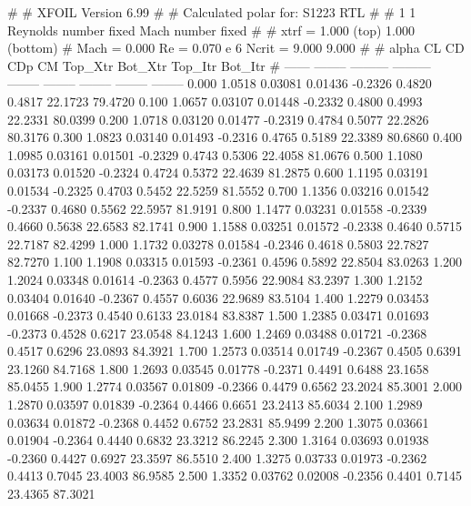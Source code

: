 #  
#       XFOIL         Version 6.99
#  
# Calculated polar for: S1223 RTL                                       
#  
# 1 1 Reynolds number fixed          Mach number fixed         
#  
# xtrf =   1.000 (top)        1.000 (bottom)  
# Mach =   0.000     Re =     0.070 e 6     Ncrit =   9.000  9.000
#  
#   alpha    CL        CD       CDp       CM     Top_Xtr  Bot_Xtr  Top_Itr  Bot_Itr
#  ------ -------- --------- --------- -------- -------- -------- -------- --------
   0.000   1.0518   0.03081   0.01436  -0.2326   0.4820   0.4817  22.1723  79.4720
   0.100   1.0657   0.03107   0.01448  -0.2332   0.4800   0.4993  22.2331  80.0399
   0.200   1.0718   0.03120   0.01477  -0.2319   0.4784   0.5077  22.2826  80.3176
   0.300   1.0823   0.03140   0.01493  -0.2316   0.4765   0.5189  22.3389  80.6860
   0.400   1.0985   0.03161   0.01501  -0.2329   0.4743   0.5306  22.4058  81.0676
   0.500   1.1080   0.03173   0.01520  -0.2324   0.4724   0.5372  22.4639  81.2875
   0.600   1.1195   0.03191   0.01534  -0.2325   0.4703   0.5452  22.5259  81.5552
   0.700   1.1356   0.03216   0.01542  -0.2337   0.4680   0.5562  22.5957  81.9191
   0.800   1.1477   0.03231   0.01558  -0.2339   0.4660   0.5638  22.6583  82.1741
   0.900   1.1588   0.03251   0.01572  -0.2338   0.4640   0.5715  22.7187  82.4299
   1.000   1.1732   0.03278   0.01584  -0.2346   0.4618   0.5803  22.7827  82.7270
   1.100   1.1908   0.03315   0.01593  -0.2361   0.4596   0.5892  22.8504  83.0263
   1.200   1.2024   0.03348   0.01614  -0.2363   0.4577   0.5956  22.9084  83.2397
   1.300   1.2152   0.03404   0.01640  -0.2367   0.4557   0.6036  22.9689  83.5104
   1.400   1.2279   0.03453   0.01668  -0.2373   0.4540   0.6133  23.0184  83.8387
   1.500   1.2385   0.03471   0.01693  -0.2373   0.4528   0.6217  23.0548  84.1243
   1.600   1.2469   0.03488   0.01721  -0.2368   0.4517   0.6296  23.0893  84.3921
   1.700   1.2573   0.03514   0.01749  -0.2367   0.4505   0.6391  23.1260  84.7168
   1.800   1.2693   0.03545   0.01778  -0.2371   0.4491   0.6488  23.1658  85.0455
   1.900   1.2774   0.03567   0.01809  -0.2366   0.4479   0.6562  23.2024  85.3001
   2.000   1.2870   0.03597   0.01839  -0.2364   0.4466   0.6651  23.2413  85.6034
   2.100   1.2989   0.03634   0.01872  -0.2368   0.4452   0.6752  23.2831  85.9499
   2.200   1.3075   0.03661   0.01904  -0.2364   0.4440   0.6832  23.3212  86.2245
   2.300   1.3164   0.03693   0.01938  -0.2360   0.4427   0.6927  23.3597  86.5510
   2.400   1.3275   0.03733   0.01973  -0.2362   0.4413   0.7045  23.4003  86.9585
   2.500   1.3352   0.03762   0.02008  -0.2356   0.4401   0.7145  23.4365  87.3021
